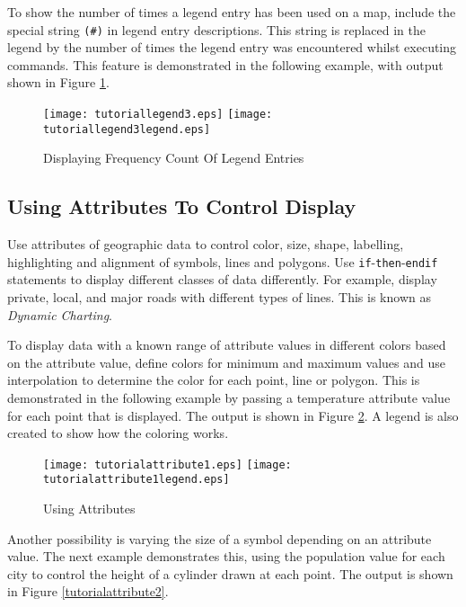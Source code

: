 To show the number of times a legend entry has been used on
a map, include the special string \texttt{(\#)} in legend entry descriptions.
This string is replaced in the legend by the number of times the legend entry
was encountered whilst executing commands.
This feature is demonstrated in the following example,
with output shown in 
Figure \ref{tutoriallegend3}.



\begin{figure}[htb]
\texttt{[image: tutoriallegend3.eps]}
\texttt{[image: tutoriallegend3legend.eps]}
\caption{Displaying Frequency Count Of Legend Entries}
\label{tutoriallegend3}
\end{figure}

\subsection{Using Attributes To Control Display}

Use attributes of geographic data to control
color, size, shape, labelling, highlighting and alignment of symbols, lines
and polygons.  Use \texttt{if}-\texttt{then}-\texttt{endif}
statements to display different classes of data
differently.  For example, display private, local, and major roads
with different types of lines.
This is known as \textit{Dynamic Charting}.

To display data with a known range of attribute values in different
colors based on the attribute value, define colors for minimum and
maximum values and use interpolation to determine the color for
each point, line or polygon.  This is demonstrated in the following
example by passing a temperature attribute value for each point
that is displayed.  The output is shown in Figure \ref{tutorialattribute1}.
A legend is also created to show how the coloring works.



\begin{figure}[htb]
\texttt{[image: tutorialattribute1.eps]}
\texttt{[image: tutorialattribute1legend.eps]}
\caption{Using Attributes}
\label{tutorialattribute1}
\end{figure}

Another possibility is varying the size of a symbol depending
on an attribute value.  The next example demonstrates this, using the
population value for each city to control the height of a
cylinder drawn at each point.
The output is shown in Figure \ref{tutorialattribute2}.


